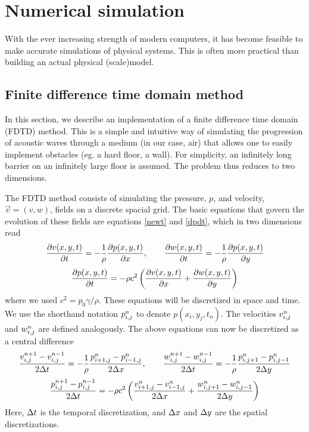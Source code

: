\section{Numerical simulation}
With the ever increasing strength of modern computers, it has become feasible to make accurate simulations of physical systems. This is often more practical than building an actual physical (scale)model.


\subsection{Finite difference time domain method}
In this section, we describe an implementation of a finite difference time domain (FDTD) method. This is a simple and intuitive way of simulating the progression of acoustic waves through a medium (in our case, air) that allows one to easily implement obstacles (eg. a hard floor, a wall). For simplicity, an infinitely long barrier on an infinitely large floor is assumed. The problem thus reduces to two dimensions.

The FDTD method consists of simulating the pressure, $p$, and velocity, $\vec{v} = (v, w)$, fields on a discrete spacial grid. The basic equations that govern the evolution of these fields are equations \ref{newt} and \ref{dpdt}, which in two dimensions read
$$
\frac{\partial v(x,y,t)}{\partial t} = -\frac{1}{\rho} \frac{\partial p(x,y,t)}{\partial x}
, \qquad
\frac{\partial w(x,y,t)}{\partial t} = -\frac{1}{\rho} \frac{\partial p(x,y,t)}{\partial y}
$$
$$
\frac{\partial p(x,y,t)}{\partial t} = -\rho c^2 \left(\frac{\partial v(x,y,t)}{\partial x} + \frac{\partial w(x,y,t)}{\partial y}\right)
$$
where we used $c^2 = p_0 \gamma / \rho$. These equations will be discretized in space and time. We use the shorthand notation $p_{i,j}^n$ to denote $p(x_i, y_j, t_n)$. The velocities $v_{i,j}^n$ and $w_{i,j}^n$ are defined analogously. The above equations can now be discretized as a central difference
$$
\frac{v_{i,j}^{n+1} - v_{i,j}^{n-1}}{2\Delta t} = -\frac{1}{\rho} \frac{p^n_{i+1,j} - p^n_{i-1,j}}{2\Delta x}
, \qquad
\frac{w_{i,j}^{n+1} - w_{i,j}^{n-1}}{2\Delta t} = -\frac{1}{\rho} \frac{p^n_{i,j+1} - p^n_{i,j-1}}{2\Delta y}
$$
$$
\frac{p_{i,j}^{n+1} - p_{i,j}^{n-1}}{2\Delta t} = 
	-\rho c^2 \left(
		\frac{v^n_{i+1,j} - v^n_{i-1,j}}{2\Delta x}
		+ \frac{w^n_{i,j+1} - w^n_{i,j-1}}{2\Delta y}
	\right)
$$
Here, $\Delta t$ is the temporal discretization, and $\Delta x$ and $\Delta y$ are the spatial discretizations.

